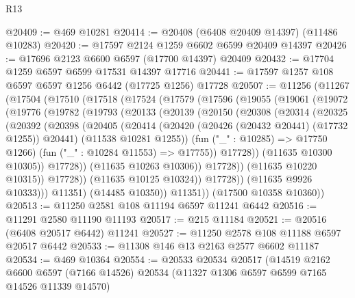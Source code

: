 \begin{lexlean}{R13}
\begin{coremodule}
@20409 := @469 @10281
@20414 := @20408 (@6408 @20409 @14397) (@11486 @10283)
@20420 := @17597 @2124 @1259 @6602 @6599 @20409 @14397
@20426 := @17696 @2123 @6600 @6597 (@17700 @14397) @20409
@20432 := @17704 @1259 @6597 @6599 @17531 @14397 @17716
@20441 := @17597 @1257 @108 @6597 @6597 @1256 @6442 (@17725 @1256) @17728
@20507 := @11256
    (@11267
      (@17504
        (@17510
          (@17518
            (@17524
              (@17579
                (@17596
                  (@19055
                    (@19061
                      (@19072
                        (@19776
                          (@19782
                            (@19793
                              (@20133
                                (@20139
                                  (@20150
                                    (@20308
                                      (@20314
                                        (@20325
                                          (@20392
                                            (@20398
                                              (@20405
                                                (@20414
                                                  (@20420
                                                    (@20426 (@20432 @20441) (@17732 @1255))
                                                    @20441)
                                                  (@11538 @10281 @1255))
                                                (fun ("_" : @10285) => @17750 @1266)
                                                (fun ("_" : @10284 @11553) => @17755))
                                              @17728))
                                          (@11635 @10300 @10305))
                                        @17728))
                                    (@11635 @10263 @10306))
                                  @17728))
                              (@11635 @10220 @10315))
                            @17728))
                        (@11635 @10125 @10324))
                      @17728))
                  (@11635 @9926 @10333)))
              @11351)
            (@14485 @10350))
          @11351))
      (@17500 @10358 @10360))
@20513 := @11250 @2581 @108 @11194 @6597 @11241 @6442
@20516 := @11291 @2580 @11190 @11193
@20517 := @215 @11184
@20521 := @20516 (@6408 @20517 @6442) @11241
@20527 := @11250 @2578 @108 @11188 @6597 @20517 @6442
@20533 := @11308 @146 @13 @2163 @2577 @6602 @11187
@20534 := @469 @10364
@20554 := @20533
    @20534
    @20517
    (@14519
      @2162
      @6600
      @6597
      (@7166 @14526)
      @20534
      (@11327 @1306 @6597 @6599 @7165 @14526 @11339 @14570)

\end{coremodule}
\end{lexlean}
